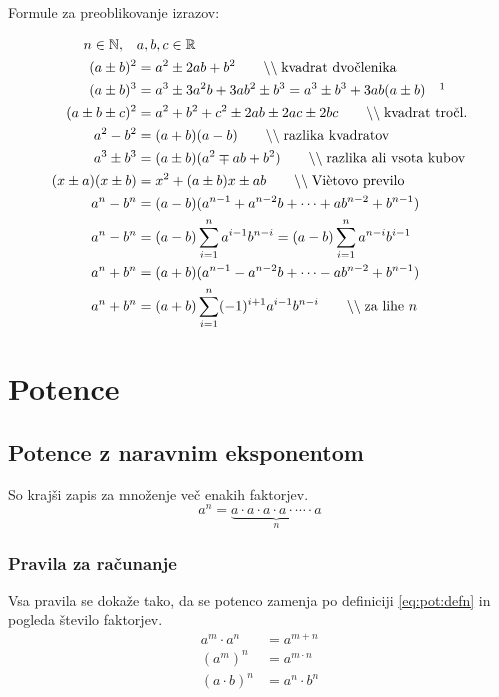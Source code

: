 \documentclass[a4paper,oneside,12pt,fleqn]{article}
\def\R{\ensuremath{\mathbb R}}
\def\N{\ensuremath{\mathbb N}}
\newcommand\krat\cdot
\newcommand{\comment}[1]{\ensuremath{\qquad\backslash\backslash\;}\textnormal{#1}}
\numberwithin{equation}{section}
\begin{document}
Formule za preoblikovanje izrazov:\\
\parbox{\textwidth}{
\begin{align}
   n \in \N, \quad & a, b, c \in \R \nonumber \\
   \label{eq:izr:kvadrat:dvoclenika} (a \pm b)^2 &= a^2 \pm 2ab + b^2 \comment{kvadrat
   dvočlenika} \\
   \label{eq:izr:kub:dvoclenika} (a \pm b)^3 &= a^3 \pm 3a^2b + 3ab^2 \pm b^3 = a^3 \pm
   b^3 + 3ab(a\pm b) \quad \footnotemark \\
   \label{eq:izr:kvadrat:troclenika} (a \pm b \pm c)^2 &= a^2 + b^2 + c^2 \pm 2ab \pm 2ac
   \pm 2bc \comment{kvadrat tročl.} \\
   \label{eq:izr:razlikakvadratov} a^2 - b^2 &= (a+b)(a-b) \comment{razlika kvadratov} \\
   \label{eq:izr:vsotakubov} a^3 \pm b^3 &= (a \pm b)(a^2 \mp ab + b^2) \comment{razlika ali
   vsota kubov} \\
   \label{eq:izr:vietovo} (x\pm a)(x\pm b) &= x^2 + (a\pm b)x \pm ab \comment{Viètovo
   previlo} \\
   \label{eq:izr:ananminusbnan} a^n - b^n &= (a - b)(a^{n-1} + a^{n-2}b + \cdots
   + ab^{n-2} + b^{n-1}) \\ 
   a^n - b^n &= (a - b)\sum_{i=1}^{n} a^{i-1}b^{n-i} = (a - b)\sum_{i=1}^{n} a^{n-i}b^{i-1} \nonumber \\
   \label{eq:izr:ananplubnan}  a^n + b^n &=  (a + b)(a^{n-1} - a^{n-2}b + \cdots
   - ab^{n-2} + b^{n-1}) \\
   a^n +b^n &= (a+b)\sum_{i=1}^{n} (-1)^{i+1}a^{i-1}b^{n-i} \comment{za lihe $n$} \nonumber
\end{align}
}

\section{Potence}
\label{sec:pot}
\subsection{Potence z naravnim eksponentom}
\label{sec:pot:nar}
So krajši zapis za množenje več enakih faktorjev.
\begin{equation}
    a^n = \underbrace{a \krat a \krat a \krat a \krat \cdots \krat a}_n
    \label{eq:pot:defn}
\end{equation}

\subsubsection{Pravila za računanje}
\label{sec:pot:nar:prav}
Vsa pravila se dokaže tako, da se potenco zamenja po definiciji \eqref{eq:pot:defn} in
pogleda število faktorjev.
\begin{align}
  a^m \krat a^n &= a^{m+n} \label{eq:pot:anankratanam} \\
  (a^m)^n &= a^{m\krat n} \label{eq:pot:anannam} \\
  (a\krat b)^n &= a^n \krat b^n \label{eq:pot:akratbnan}
\end{align}
\end{document}
